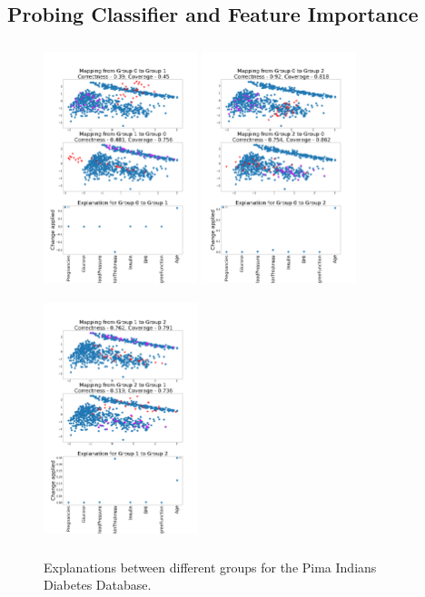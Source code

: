 \subsection{Probing Classifier and Feature Importance}
\label{app:dc}
\begin{figure}
    \includegraphics[width=0.4\textwidth, height=7.2cm]{images/diabetes/diabetes-0to1.png}
    \includegraphics[width=0.4\textwidth, height=7.2cm]{images/diabetes/diabetes-0to2.png}
    \includegraphics[width=0.4\textwidth, height=7.2cm]{images/diabetes/diabetes-1to2.png}
    \caption{Explanations between different groups for the Pima Indians Diabetes Database.}
    \label{fig:diabetes_0}
\end{figure}
